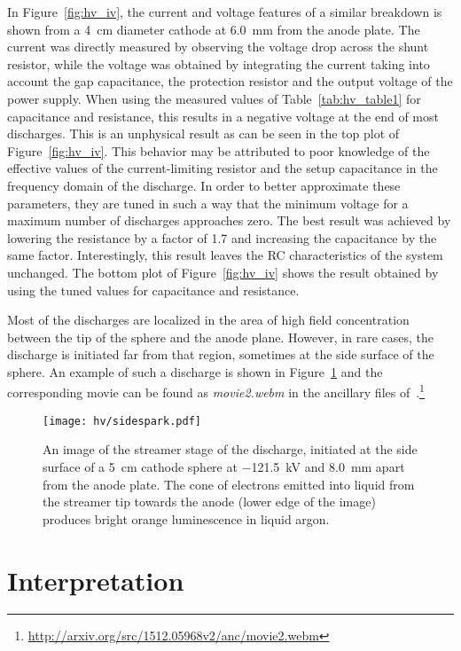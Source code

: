 In Figure~\ref{fig:hv_iv}, the current and voltage features of a similar breakdown is shown from a \SI{4}{\centi\metre} diameter cathode at \SI{6.0}{\milli\metre} from the anode plate.
The current was directly measured by observing the voltage drop across the shunt resistor, while the voltage was obtained by integrating the current taking into account the gap capacitance, the protection resistor and the output voltage of the power supply.
When using the measured values of Table~\ref{tab:hv_table1} for capacitance and resistance, this results in a negative voltage at the end of most discharges.
This is an unphysical result as can be seen in the top plot of Figure~\ref{fig:hv_iv}.
This behavior may be attributed to poor knowledge of the effective values of the current-limiting resistor and the setup capacitance in the frequency domain of the discharge.
In order to better approximate these parameters, they are tuned in such a way that the minimum voltage for a maximum number of discharges approaches zero.
The best result was achieved by lowering the resistance by a factor of 1.7 and increasing the capacitance by the same factor.
Interestingly, this result leaves the RC characteristics of the system unchanged.
The bottom plot of Figure~\ref{fig:hv_iv} shows the result obtained by using the tuned values for capacitance and resistance.

Most of the discharges are localized in the area of high field concentration between the tip of the sphere and the anode plane.
However, in rare cases, the discharge is initiated far from that region, sometimes at the side surface of the sphere.
An example of such a discharge is shown in Figure~\ref{fig:hv_side} and the corresponding movie can be found as \emph{movie2.webm} in the ancillary files of~\cite{breakdown_16}.\footnote{\href{http://arxiv.org/src/1512.05968v2/anc/movie2.webm}{http://arxiv.org/src/1512.05968v2/anc/movie2.webm}}

\begin{figure}[htb]
	\centering	
	\texttt{[image: hv/sidespark.pdf]}
	\caption{An image of the streamer stage of the discharge, initiated at the side surface of a \SI{5}{\centi\metre} cathode sphere at \SI{-121.5}{\kilo\volt} and \SI{8.0}{\milli\metre} apart from the anode plate. The cone of electrons emitted into liquid from the streamer tip towards the anode (lower edge of the image) produces bright orange luminescence in liquid argon.}
	\label{fig:hv_side}
\end{figure}


\section{Interpretation}

